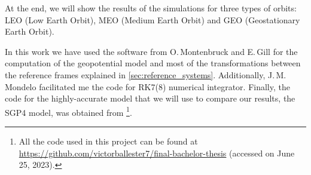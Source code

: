 \documentclass[../main.tex]{subfiles}
\begin{document}
At the end, we will show the results of the simulations for three types of orbits: LEO (Low Earth Orbit), MEO (Medium Earth Orbit) and GEO (Geostationary Earth Orbit).

In this work we have used the software from O.\,Montenbruck and E.\,Gill \cite{montenbruck} for the computation of the geopotential model and most of the transformations between the reference frames explained in \cref{sec:reference_systems}. Additionally, J.\,M.\,Mondelo facilitated me the code for RK7(8) numerical integrator. Finally, the code for the highly-accurate model that we will use to compare our results, the SGP4 model, was obtained from \cite{code_sgp4}\footnote{All the code used in this project can be found at \url{https://github.com/victorballester7/final-bachelor-thesis} (accessed on June 25, 2023).}.
\end{document}
